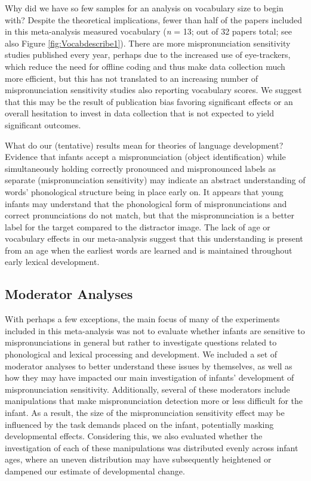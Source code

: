 \documentclass[man]{apa6}
\begin{document}
Why did we have so few samples for an analysis on vocabulary size to begin with? Despite the theoretical implications, fewer than half of the papers included in this meta-analysis measured vocabulary (\emph{n} = 13; out of 32 papers total; see also Figure \ref{fig:Vocabdescribe1}). There are more mispronunciation sensitivity studies published every year, perhaps due to the increased use of eye-trackers, which reduce the need for offline coding and thus make data collection much more efficient, but this has not translated to an increasing number of mispronunciation sensitivity studies also reporting vocabulary scores. We suggest that this may be the result of publication bias favoring significant effects or an overall hesitation to invest in data collection that is not expected to yield significant outcomes.

What do our (tentative) results mean for theories of language development? Evidence that infants accept a mispronunciation (object identification) while simultaneously holding correctly pronounced and mispronounced labels as separate (mispronunciation sensitivity) may indicate an abstract understanding of words' phonological structure being in place early on. It appears that young infants may understand that the phonological form of mispronunciations and correct pronunciations do not match, but that the mispronunciation is a better label for the target compared to the distractor image. The lack of age or vocabulary effects in our meta-analysis suggest that this understanding is present from an age when the earliest words are learned and is maintained throughout early lexical development.

\hypertarget{moderator-analyses-1}{%
\subsection{Moderator Analyses}\label{moderator-analyses-1}}

With perhaps a few exceptions, the main focus of many of the experiments included in this meta-analysis was not to evaluate whether infants are sensitive to mispronunciations in general but rather to investigate questions related to phonological and lexical processing and development. We included a set of moderator analyses to better understand these issues by themselves, as well as how they may have impacted our main investigation of infants' development of mispronunciation sensitivity. Additionally, several of these moderators include manipulations that make mispronunciation detection more or less difficult for the infant. As a result, the size of the mispronunciation sensitivity effect may be influenced by the task demands placed on the infant, potentially masking developmental effects. Considering this, we also evaluated whether the investigation of each of these manipulations was distributed evenly across infant ages, where an uneven distribution may have subsequently heightened or dampened our estimate of developmental change.
\end{document}
